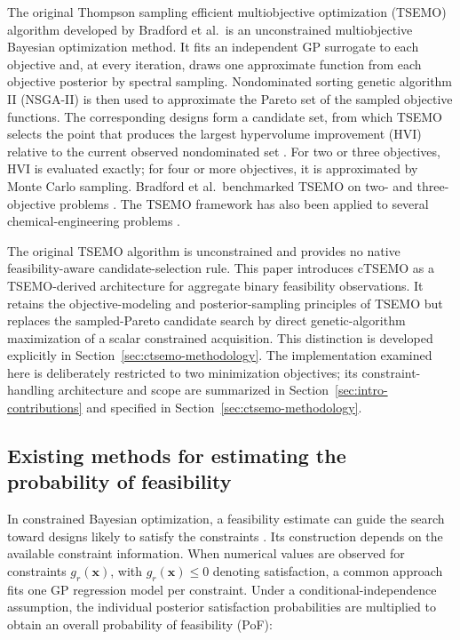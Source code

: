 \documentclass[twoside]{article}
\begin{document}
The original Thompson sampling efficient multiobjective optimization (TSEMO)
algorithm developed by Bradford et al.\ is an unconstrained multiobjective
Bayesian optimization method. It fits an independent GP
surrogate to each objective and, at every iteration, draws one approximate
function from each objective posterior by spectral sampling.  Nondominated
sorting genetic algorithm II (NSGA-II) is then used to approximate the Pareto
set of the sampled objective functions.  The corresponding designs form a
candidate set, from which TSEMO selects the point that produces the largest
hypervolume improvement (HVI) relative to the current observed nondominated
set \cite{deb2002nsga2,bradford2018tsemo}. For two or three objectives, HVI is evaluated
exactly; for four or more objectives, it is approximated by Monte Carlo
sampling. Bradford et al.\ benchmarked TSEMO on two- and three-objective
problems \cite{bradford2018tsemo}. The TSEMO framework has also been applied to
several chemical-engineering problems
\cite{helmdach2017lca,schweidtmann2018flow,amar2019solvent,
clayton2020selfoptimisation}.

The original TSEMO algorithm is unconstrained and provides no native
feasibility-aware candidate-selection rule. This paper introduces cTSEMO as a TSEMO-derived
architecture for aggregate binary feasibility observations. It retains the
objective-modeling and posterior-sampling principles of TSEMO but replaces the
sampled-Pareto candidate search by direct genetic-algorithm maximization of a
scalar constrained acquisition. This distinction is developed explicitly in
Section~\ref{sec:ctsemo-methodology}.
The implementation examined here is deliberately restricted to two
minimization objectives; its constraint-handling architecture and scope are
summarized in Section~\ref{sec:intro-contributions} and specified in
Section~\ref{sec:ctsemo-methodology}.

\subsection{Existing methods for estimating the probability of feasibility}
\label{sec:intro-pof-methods}

In constrained Bayesian optimization, a feasibility estimate can guide the
search toward designs likely to satisfy the constraints
\cite{gardner2014constraints,gelbart2014unknown}. Its construction depends on
the available constraint information. When numerical values are observed for
constraints \(g_r(\mathbf{x})\), with \(g_r(\mathbf{x})\leq0\) denoting
satisfaction, a common approach fits one GP regression model per constraint.
Under a conditional-independence assumption, the individual posterior
satisfaction probabilities are multiplied to obtain an overall probability
of feasibility (PoF):
\end{document}
